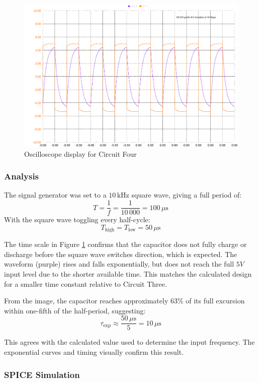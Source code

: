 \documentclass[12pt]{article}
\begin{document}
\begin{figure}[H]
	\centering
	\includegraphics[width=16cm]{05_scopy2}
	\caption{Oscilloscope display for Circuit Four}
	\label{fig:circuit4oscope}
\end{figure}

\subsubsection{Analysis}
The signal generator was set to a $10\,\mathrm{kHz}$ square wave, giving a full period of:
\[
	T = \frac{1}{f} = \frac{1}{10\,000} = 100\,\mu\mathrm{s}
\]
With the square wave toggling every half-cycle:
\[
	T_{\text{high}} = T_{\text{low}} = 50\,\mu\mathrm{s}
\]

The time scale in Figure \ref{fig:circuit4oscope} confirms that the capacitor
does not fully charge or discharge before the square wave switches direction,
which is expected. The waveform (purple) rises and falls exponentially, but does
not reach the full $5V$ input level due to the shorter available time. This matches the calculated design for a smaller time constant relative to Circuit Three.

From the image, the capacitor reaches approximately 63\% of its full excursion within one-fifth of the half-period, suggesting:
\[
	\tau_{\text{exp}} \approx \frac{50\,\mu\mathrm{s}}{5} = 10\,\mu\mathrm{s}
\]

This agrees with the calculated value used to determine the input frequency. The exponential curves and timing visually confirm this result.

\subsubsection{SPICE Simulation}
\end{document}
